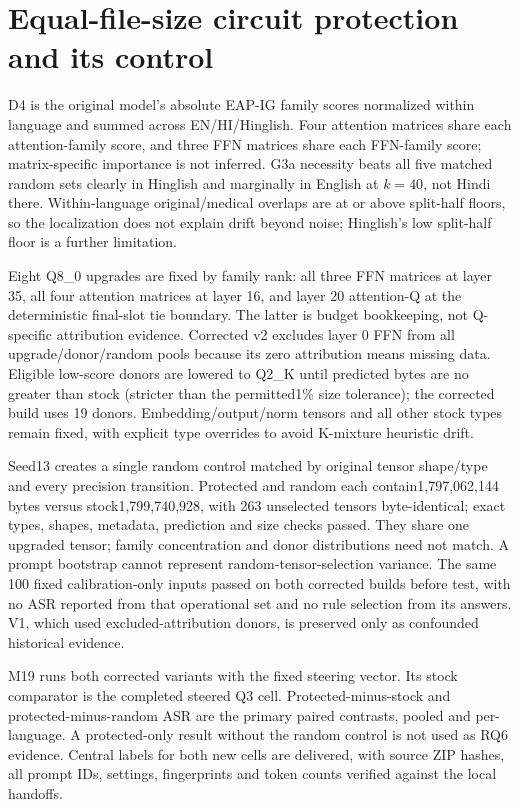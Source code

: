\section{Equal-file-size circuit protection and its control}
D4 is the original model's absolute EAP-IG family scores normalized within language and summed across EN/HI/Hinglish. Four attention matrices share each attention-family score, and three FFN matrices share each FFN-family score; matrix-specific importance is not inferred. G3a necessity beats all five matched random sets clearly in Hinglish and marginally in English at $k=40$, not Hindi there. Within-language original/medical overlaps are at or above split-half floors, so the localization does not explain drift beyond noise; Hinglish's low split-half floor is a further limitation.

Eight Q8\_0 upgrades are fixed by family rank: all three FFN matrices at layer 35, all four attention matrices at layer 16, and layer 20 attention-Q at the deterministic final-slot tie boundary. The latter is budget bookkeeping, not Q-specific attribution evidence. Corrected v2 excludes layer 0 FFN from all upgrade/donor/random pools because its zero attribution means missing data. Eligible low-score donors are lowered to Q2\_K until predicted bytes are no greater than stock (stricter than the permitted1\% size tolerance); the corrected build uses 19 donors. Embedding/output/norm tensors and all other stock types remain fixed, with explicit type overrides to avoid K-mixture heuristic drift.

Seed13 creates a single random control matched by original tensor shape/type and every precision transition. Protected and random each contain1,797,062,144 bytes versus stock1,799,740,928, with 263 unselected tensors byte-identical; exact types, shapes, metadata, prediction and size checks passed. They share one upgraded tensor; family concentration and donor distributions need not match. A prompt bootstrap cannot represent random-tensor-selection variance. The same 100 fixed calibration-only inputs passed on both corrected builds before test, with no ASR reported from that operational set and no rule selection from its answers. V1, which used excluded-attribution donors, is preserved only as confounded historical evidence.

M19 runs both corrected variants with the fixed steering vector. Its stock comparator is the completed steered Q3 cell. Protected-minus-stock and protected-minus-random ASR are the primary paired contrasts, pooled and per-language. A protected-only result without the random control is not used as RQ6 evidence. Central labels for both new cells are delivered, with source ZIP hashes, all prompt IDs, settings, fingerprints and token counts verified against the local handoffs.

